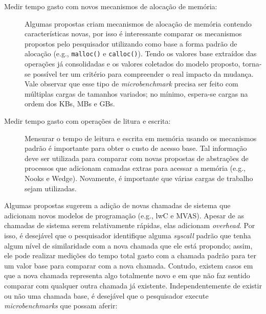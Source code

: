 \begin{description}

  \item[Medir tempo gasto com novos mecanismos de alocação de memória:]

Algumas propostas criam mecanismos de alocação de memória contendo
características novas, por isso é interessante comparar os mecanismos
propostos pelo pesquisador utilizando como base a forma padrão de alocação
(e.g., \texttt{malloc()} e \texttt{calloc()}). Tendo os valores base extraídos
das operações já consolidadas e os valores coletados do modelo proposto,
torna-se possível ter um critério para compreender o real impacto da mudança.
Vale observar que esse tipo de \emph{microbenchmark} precisa ser feito com
múltiplas cargas de tamanhos variados; no mínimo, espera-se cargas na ordem dos
KBs, MBs e GBs.

  \item[Medir tempo gasto com operações de litura e escrita:]

Mensurar o tempo de leitura e escrita em memória usando os mecanismos
padrão é importante para obter o custo de acesso base. Tal informação deve ser
utilizada para comparar com novas propostas de abstrações de processos que
adicionam camadas extras para acessar a memória (e.g., Nooks e Wedge).
Novamente, é importante que várias cargas de trabalho sejam utilizadas.

\end{description}

Algumas propostas sugerem a adição de novas chamadas de sistema que adicionam
novos modelos de programação (e.g., lwC e MVAS). Apesar de as chamadas de sistema
serem relativamente rápidas, elas adicionam \emph{overhead}. Por isso, é
desejável que o pesquisador identifique alguma \emph{syscall} padrão que tenha
algum nível de similaridade com a nova chamada que ele está propondo; assim, ele
pode realizar medições do tempo total gasto com a chamada padrão para ter um valor
base para comparar com a nova chamada. Contudo, existem casos em que a nova
chamada representa algo totalmente novo e em que não faz sentido comparar com
qualquer outra chamada já existente. Independentemente de existir ou não uma
chamada base, é desejável que o pesquisador execute \emph{microbenchmarks} que
possam aferir:

